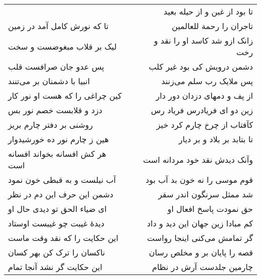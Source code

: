 \begin{center}
\begin{longtable}{l p{0.5cm} r}
&&
تا بود از غبن و از حیله بعید
\\
تا که نورش کامل آمد در زمین
&&
تاجران را رحمة للعالمین
\\
لیک بر قلاب مبغوضست و سخت
&&
زانک ازو شد کاسد او را نقد و رخت
\\
پس عدو جان صرافست قلب
&&
دشمن درویش کی بود غیر کلب
\\
انبیا با دشمنان بر می‌تنند
&&
پس ملایک رب سلم می‌زنند
\\
کین چراغی را که هست او نور کار
&&
از پف و دمهای دزدان دور دار
\\
دزد و قلابست خصم نور بس
&&
زین دو ای فریادرس فریاد رس
\\
روشنی بر دفتر چارم بریز
&&
کآفتاب از چرخ چارم کرد خیز
\\
هین ز چارم نور ده خورشیدوار
&&
تا بتابد بر بلاد و بر دیار
\\
هر کش افسانه بخواند افسانه است
&&
وآنک دیدش نقد خود مردانه است
\\
آب نیلست و به قبطی خون نمود
&&
قوم موسی را نه خون بد آب بود
\\
دشمن این حرف این دم در نظر
&&
شد ممثل سرنگون اندر سقر
\\
ای ضیاء الحق تو دیدی حال او
&&
حق نمودت پاسخ افعال او
\\
دیدهٔ غیبت چو غیبست اوستاد
&&
کم مبادا زین جهان این دید و داد
\\
این حکایت را که نقد وقت ماست
&&
گر تمامش می‌کنی اینجا رواست
\\
ناکسان را ترک کن بهر کسان
&&
قصه را پایان بر و مخلص رسان
\\
این حکایت گر نشد آنجا تمام
&&
چارمین جلدست آرش در نظام
\\
\end{longtable}
\end{center}
